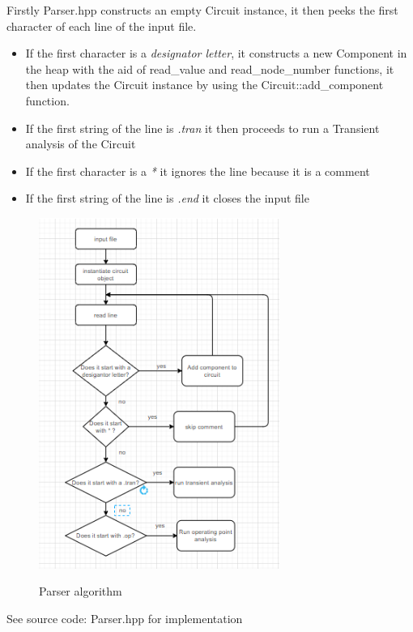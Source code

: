 \documentclass{article}
\begin{document}
Firstly Parser.hpp constructs an empty Circuit instance, it then peeks the first character of each line of the input file.
\begin{itemize}
\item If the first character is a \textit{designator letter}, it constructs a new Component in the heap with the aid of read\_value and read\_node\_number functions, it then updates the Circuit instance by using the Circuit::add\_component function.
\item If the first string of the line is \textit{.tran} it then proceeds to run a Transient analysis of the Circuit 
\item If the first character is a \textit{*} it ignores the line because it is a comment
\item If the first string of the line is \textit{.end} it closes the input file
\end{itemize}

\begin{figure}[h]
    \caption{Parser algorithm}
    \centering
    \includegraphics[width=0.7\textwidth]{images/Parser_flowchart.PNG}
    \label{fig:ParserFlowchart}
\end{figure}

\bigbreak
See source code: Parser.hpp for implementation
\end{document}
